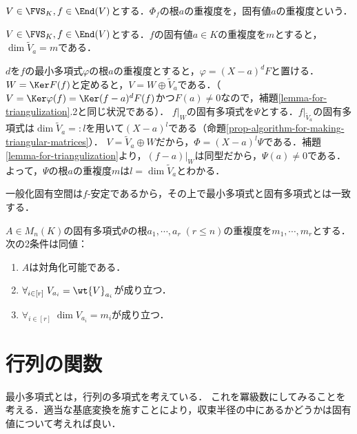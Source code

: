 \documentclass[uplatex, dvipdfmx]{jsreport}
\begin{document}
\begin{definition}
    $V\in\FVS_K,f\in\End(V)$とする．$\Phi_f$の根$a$の重複度を，固有値$a$の重複度という．
\end{definition}

\begin{proposition}\label{prop-algebraic-multiplicity-is-dimension-of-generalized-eigenspace}
    $V\in\FVS_K,f\in\End(V)$とする．$f$の固有値$a\in K$の重複度を$m$とすると，$\dim\widetilde{V}_{a}=m$である．
\end{proposition}
\begin{Proof}
    $d$を$f$の最小多項式$\varphi$の根$a$の重複度とすると，$\varphi=(X-a)^dF$と置ける．$W=\Ker F(f)$と定めると，$V=W\oplus\widetilde{V}_a$である．（$V=\Ker\varphi(f)=\Ker(f-a)^dF(f)$かつ$F(a)\ne 0$なので，補題\ref{lemma-for-triangulization}.2と同じ状況である）．
    $f|_W$の固有多項式を$\Psi$とする．$f|_{\widetilde{V}_a}$の固有多項式は$\dim\widetilde{V}_a=:l$を用いて$(X-a)^l$である（命題\ref{prop-algorithm-for-making-triangular-matrices}）．
    $V=\widetilde{V}_a\oplus W$だから，$\Phi=(X-a)^l\Psi$である．補題\ref{lemma-for-triangulization}より，$(f-a)|_W$は同型だから，$\Psi(a)\ne 0$である．よって，$\Psi$の根$a$の重複度$m$は$l=\dim\widetilde{V}_a$とわかる．
\end{Proof}
\begin{remarks}
    一般化固有空間は$f$-安定であるから，その上で最小多項式と固有多項式とは一致する．
\end{remarks}

\begin{corollary}
    $A\in M_n(K)$の固有多項式$\Phi$の根$a_1,\cdots,a_r\;(r\le n)$の重複度を$m_1,\cdots,m_r$とする．次の2条件は同値：
    \begin{enumerate}
        \item $A$は対角化可能である．
        \item $\forall_{i\in[r]}\;V_{a_i}=\wt{V}_{a_i}$が成り立つ．
        \item $\forall_{i\in[r]}\;\dim V_{a_i}=m_i$が成り立つ．
    \end{enumerate}
\end{corollary}

\section{行列の関数}

\begin{tcolorbox}[colframe=ForestGreen, colback=ForestGreen!10!white,breakable,colbacktitle=ForestGreen!40!white,coltitle=black,fonttitle=\bfseries\sffamily,
title=]
    最小多項式とは，行列の多項式を考えている．
    これを冪級数にしてみることを考える．適当な基底変換を施すことにより，収束半径の中にあるかどうかは固有値について考えれば良い．
\end{tcolorbox}
\end{document}
